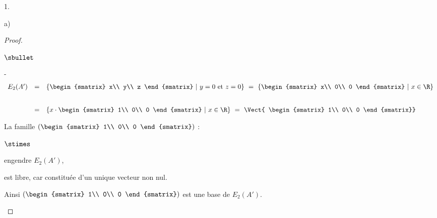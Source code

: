 \documentclass[11pt]{article}%
\begin{document}
\begin{noliste}{1.}
\begin{noliste}{a)}
\begin{proof}
\begin{noliste}{$\sbullet$}
\begin{noliste}{-}
\[\begin{array}{rcl}
	      E_2(A') & = &  \{ 
	      \begin{smatrix}
	        x\\
	        y\\
	        z
	      \end{smatrix} \ | \ y=0 \ \text{et} \ z=0 \}
	      \ = \ \{
	      \begin{smatrix}
	        x\\
	        0\\
	        0
	      \end{smatrix} \ | \ x \in \R \}
	      \\[.8cm]
	      & = &  \{ x \cdot 
	      \begin{smatrix}
	        1\\
	        0\\
	        0
	      \end{smatrix} \ | \ x \in \R \}
	      \ = \ \Vect{
	      \begin{smatrix}
	        1\\
	        0\\
	        0
	      \end{smatrix}}
	    \end{array}
	  \]
	  
	  
	  
	  \newpage
	  
	  
	  
	  La famille $\left(
	  \begin{smatrix}
	    1\\
	    0\\
	    0
	  \end{smatrix}\right)$ :
	  \end{noliste}
	  \begin{liste}{$\stimes$}
	    \item engendre $E_2(A')$,
	    \item est libre, car constituée d'un unique vecteur non 
	    nul.
	  \end{liste}
	  Ainsi $\left(
	  \begin{smatrix}
	    1\\
	    0\\
	    0
	  \end{smatrix}\right)$ est une base de $E_2(A')$.
	  

\end{noliste}
\end{proof}
\end{noliste}
\end{noliste}
\end{document}
